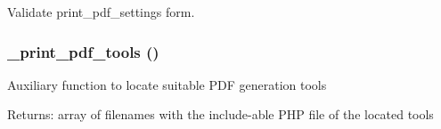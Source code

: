 Validate print\_\-pdf\_\-settings form. \hypertarget{print__pdf_8admin_8inc_825739391462416742dd7d112121a13b}{
\subsubsection[{\_\-print\_\-pdf\_\-tools}]{\setlength{\rightskip}{0pt plus 5cm}\_\-print\_\-pdf\_\-tools ()}}
\label{print__pdf_8admin_8inc_825739391462416742dd7d112121a13b}


Auxiliary function to locate suitable PDF generation tools

\begin{Desc}
\item[Returns:]array of filenames with the include-able PHP file of the located tools \end{Desc}
